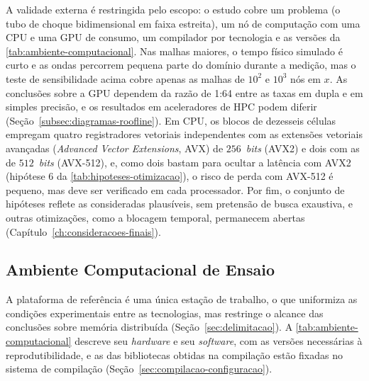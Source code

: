 A validade externa é restringida pelo escopo: o estudo cobre um problema (o tubo de choque bidimensional em faixa estreita), um nó de computação com uma CPU e uma GPU de consumo, um compilador por tecnologia e as versões da \autoref{tab:ambiente-computacional}.
Nas malhas maiores, o tempo físico simulado é curto e as ondas percorrem pequena parte do domínio durante a medição, mas o teste de sensibilidade acima cobre apenas as malhas de \(10^2\) e \(10^3\) nós em \(x\).
As conclusões sobre a GPU dependem da razão de 1:64 entre as taxas em dupla e em simples precisão, e os resultados em aceleradores de HPC podem diferir (Seção~\ref{subsec:diagramas-roofline}).
Em CPU, os blocos de dezesseis células empregam quatro registradores vetoriais independentes com as extensões vetoriais avançadas (\textit{Advanced Vector Extensions}, AVX) de $256$~\textit{bits} (AVX2) e dois com as de $512$~\textit{bits} (AVX-512), e, como dois bastam para ocultar a latência com AVX2 (hipótese 6 da \autoref{tab:hipoteses-otimizacao}), o risco de perda com AVX-512 é pequeno, mas deve ser verificado em cada processador.
Por fim, o conjunto de hipóteses reflete as consideradas plausíveis, sem pretensão de busca exaustiva, e outras otimizações, como a blocagem temporal, permanecem abertas (Capítulo~\ref{ch:consideracoes-finais}).


\subsection{Ambiente Computacional de Ensaio}\label{subsec:ambiente-computacional}

A plataforma de referência é uma única estação de trabalho, o que uniformiza as condições experimentais entre as tecnologias, mas restringe o alcance das conclusões sobre memória distribuída (Seção~\ref{sec:delimitacao}).
A \autoref{tab:ambiente-computacional} descreve seu \textit{hardware} e seu \textit{software}, com as versões necessárias à reprodutibilidade, e as das bibliotecas obtidas na compilação estão fixadas no sistema de compilação (Seção~\ref{sec:compilacao-configuracao}).

